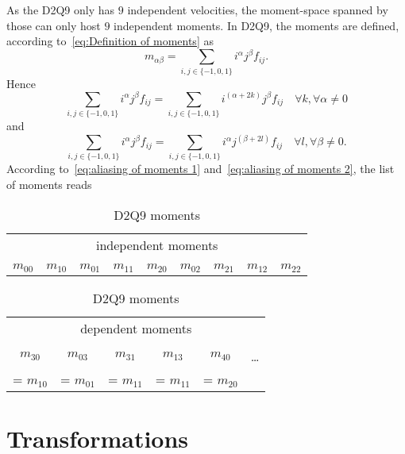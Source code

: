 \documentclass{article}
\begin{document}
As the D2Q9 only has $9$ independent velocities, the moment-space spanned by those can only host $9$ independent moments.
In D2Q9, the moments are defined, according to~\eqref{eq:Definition of moments} as
\begin{equation*}
  m_{\alpha\beta} = \sum_{i,j \in \{-1,0,1\}} i^\alpha j^\beta f_{ij}.
\end{equation*}
Hence
\begin{equation}
  \label{eq:aliasing of moments 1}
  \sum_{i,j \in \{-1,0,1\}} i^\alpha j^\beta f_{ij} = \sum_{i,j \in \{-1,0,1\}} i^{(\alpha+2k)} j^\beta f_{ij} \quad \forall k, \forall \alpha \neq 0
\end{equation}
and
\begin{equation}
  \label{eq:aliasing of moments 2}
  \sum_{i,j \in \{-1,0,1\}} i^\alpha j^\beta f_{ij} = \sum_{i,j \in \{-1,0,1\}} i^\alpha j^{(\beta+2l)} f_{ij} \quad \forall l, \forall \beta \neq 0.
\end{equation}
According to~\eqref{eq:aliasing of moments 1} and~\eqref{eq:aliasing of moments 2}, the list of moments reads

\begin{table} [h!]
  \centering
  \begin{tabular}{c cc ccc cc c}
    \toprule
    \multicolumn{9}{c}{independent moments}  \\
    \cmidrule(lr){1-9} \\
    $m_{00}$   &   $m_{10}$ & $m_{01}$   &   $m_{11}$ & $m_{20}$ & $m_{02}$   &   $m_{21}$ & $m_{12}$   &   $m_{22}$ \\
    \bottomrule
  \end{tabular}
  \newline
  \vspace*{.5 cm}
  \newline
  \begin{tabular}{ccccc c}
    \toprule
    \multicolumn{6}{c}{dependent moments}   \\
    \cmidrule(lr){1-5}   \\
    $m_{30}$   & $m_{03}$   & $m_{31}$  & $m_{13}$  & $m_{40}$  & \ldots \\
    = $m_{10}$ & = $m_{01}$ & = $m_{11}$ & = $m_{11}$ & = $m_{20}$ & \\
    \bottomrule
  \end{tabular}
  \caption{D2Q9 moments}\label{table:D2Q9 moments}
\end{table}


\section{Transformations}
\label{sec:Transformations}
\end{document}
